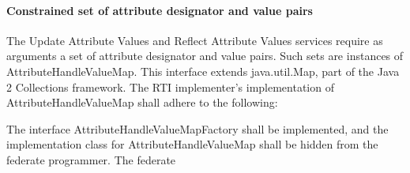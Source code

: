 \begin{compactstdpage}
    \paragraph{Constrained set of attribute designator and value pairs}

    The Update Attribute Values and Reflect Attribute Values \rtiinitiated{} services require as arguments a set of attribute designator and value pairs. Such sets are instances of AttributeHandleValueMap. This interface extends java.util.Map, part of the Java 2 Collections framework. The RTI implementer's implementation of AttributeHandleValueMap shall adhere to the following:

    The interface AttributeHandleValueMapFactory shall be implemented, and the implementation class for AttributeHandleValueMap shall be hidden from the federate programmer. The federate

\end{compactstdpage}

\clearpage

